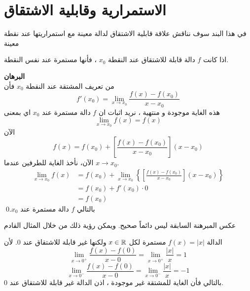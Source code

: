 \section{الاستمرارية وقابلية الاشتقاق \cite{introrealanal}}

في هذا البند سوف نناقش علاقة قابلية الاشتقاق لدالة معينة مع استمراريتها عند نقطة معينة
\begin{theorem}
	اذا كانت $f$ دالة قابلة للاشتقاق عند النقطة $x_0 $ ، فأنها مستمرة عند نفس النقطة.
\end{theorem} 
\noindent
\textbf{البرهان}\\
\noindent
من تعريف المشتقة عند النقطة $x_0 $ فأن 
\[
f'(x_0) = \lim\limits_{x\to x_0} \frac{f(x) - f(x_0 )}{x-x_0}
\]
هذه الغاية موجودة و منتهية ، نريد اثبات ان $f$ دالة مستمرة عند $x_0 $ اي بمعنى 
\[
\lim\limits_{x\to x_0} f(x) = f(x)
\]
الآن 
\[
f(x) = f(x_0) + \left[\frac{f(x) - f(x_0)}{x-x_0}\right] (x-x_0)
\]
الآن، نأخذ الغاية للطرفين عندما $x\to x_0 $.
\begin{align*}
\lim\limits_{x\to  x_0}f(x) &= f(x_0) + \lim\limits_{x\to x_0}
\left\{
\left[\frac{f(x) - f(x_0)}{x-x_0}\right] (x-x_0)
\right\}\\
&= f(x_0 ) + f'(x_0) \cdot 0\\
&= f(x_0)
\end{align*}
بالتالي $f$ دالة مستمرة عند $x_0$.\qed

\begin{note}
	عكس المبرهنة السابقة ليس دائماً صحيح. ويمكن رؤية ذلك من خلال المثال القادم
\end{note}

\begin{example}
	الدالة $f(x) = |x|$ مستمرة لكل $x\in\mathbb{R}$ ولكنها غير قابلة للاشتقاق عند 0. لأن 
	\[
	\lim\limits_{x\to 0^+} \frac{f(x) - f(0)}{x-0} = \lim\limits_{x\to 0^+} \frac{|x|}{x} = 1
	\]  
	\[
		\lim\limits_{x\to 0^-} \frac{f(x) - f(0)}{x-0} = \lim\limits_{x\to 0^-} \frac{|x|}{x} = -1
	\]
	بالتالي فأن الغاية للمشتقة غير موجودة ، اذن الدالة غير قابلة للاشتقاق عند 0.
	
	\begin{figure}[H]
		\centering
		\caption{}
	\end{figure}
\end{example}

